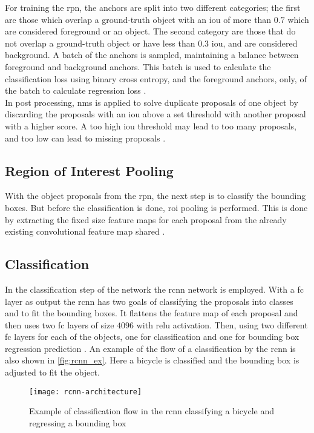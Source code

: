 For training the \gls{rpn}, the anchors are split into two different categories; the first are those which overlap a ground-truth object with an \gls{iou} of more than $0.7$ which are considered foreground or an object. The second category are those that do not overlap a ground-truth object or have less than $0.3$ \gls{iou}, and are considered background. 
A batch of the anchors is sampled, maintaining a balance between foreground and background anchors. This batch is used to calculate the classification loss using binary cross entropy, and the foreground anchors, only, of the batch to calculate regression loss \citep{Ren2017}.\\

In post processing, \gls{nms} is applied to solve duplicate proposals of one object by discarding the proposals with an \gls{iou} above a set threshold with another proposal with a higher score. A too high \gls{iou} threshold may lead to too many proposals, and too low can lead to missing proposals \citep{Ren2017}.

\subsection{Region of Interest Pooling}
With the object proposals from the \gls{rpn}, the next step is to classify the bounding boxes. But before the classification is done, \gls{roi} pooling is performed. This is done by extracting the fixed size feature maps for each proposal from the already existing convolutional feature map shared \citep{Ren2017}.

\subsection{Classification}
In the classification step of the network the \gls{rcnn} network is employed. With a \gls{fc} layer as output the \gls{rcnn} has two goals of classifying the proposals into classes and to fit the bounding boxes. It flattens the feature map of each proposal and then uses two \gls{fc} layers of size $4096$ with \gls{relu} activation. Then, using two different \gls{fc} layers for each of the objects, one for classification and one for bounding box regression prediction \citep{Ren2017}. An example of the flow of a classification by the \gls{rcnn} is also shown in \autoref{fig:rcnn_ex}. Here a bicycle is classified and the bounding box is adjusted to fit the object.

\begin{figure}[H]
	\centering
	\texttt{[image: rcnn-architecture]}
	\caption{Example of classification flow in the \gls{rcnn} classifying a bicycle and regressing a bounding box \citep{Rey2018}}
	\label{fig:rcnn_ex}
\end{figure}
